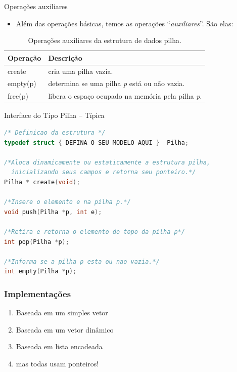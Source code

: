    \begin{frame}{Operações auxiliares}   
			\begin{itemize}
				\item Além das operações básicas, temos as operações ``\textit{auxiliares}''. São elas:
			\end{itemize}
			\begin{table}[ht]
			  \centering
						\begin{tabular}{l|l}
						    \hline \textbf{Operação} & \textbf{Descrição} \\
						    \hline create & cria uma pilha vazia.\\
						    \hline empty(p) & determina se uma pilha \textit{p} está ou não vazia.\\
						    \hline free(p) & libera o espaço ocupado na memória pela pilha \textit{p}.\\
						    \hline 
						\end{tabular}
						\caption{Operações auxiliares da estrutura de dados pilha.}
				\end{table}
  \end{frame}
  
\begin{frame}{Interface do Tipo Pilha -- Típica}
\begin{lstlisting}[language=C]
/* Definicao da estrutura */
typedef struct { DEFINA O SEU MODELO AQUI }  Pilha;

/*Aloca dinamicamente ou estaticamente a estrutura pilha, 
  inicializando seus campos e retorna seu ponteiro.*/
Pilha * create(void);

/*Insere o elemento e na pilha p.*/
void push(Pilha *p, int e);

/*Retira e retorna o elemento do topo da pilha p*/
int pop(Pilha *p);

/*Informa se a pilha p esta ou nao vazia.*/
int empty(Pilha *p);
\end{lstlisting}
\end{frame}



\begin{frame}
\frametitle{Implementações} 


\begin{enumerate}

  \item Baseada em um simples vetor
    \item Baseada em um vetor dinâmico
      \item Baseada em lista encadeada
      \pause
      \item mas todas usam ponteiros!


\end{enumerate}


\end{frame}


